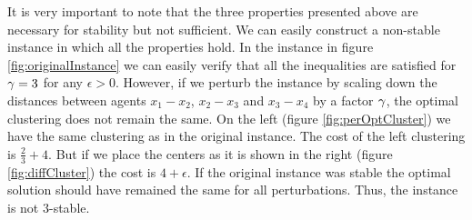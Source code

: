 It is very important to note that the three properties presented above are necessary for stability but not sufficient. We can easily construct a non-stable instance in which all the properties hold. In the instance in figure \ref{fig:originalInstance} we can easily verify that all the inequalities are satisfied for $\gamma=3$ for any $\epsilon >0$. However, if we perturb the instance by scaling down the distances between agents $x_1-x_2$, $x_2-x_3$ and $x_3-x_4$ by a factor $\gamma$, the optimal clustering does not remain the same. On the left (figure \ref{fig:perOptCluster}) we have the same clustering as in the original instance. The cost of the left clustering is $\frac{2}{3}+4$. But if we place the centers as it is shown in the right (figure \ref{fig:diffCluster})  the cost is $4+\epsilon$. If the original instance was stable the optimal solution should have remained the same for all perturbations. Thus, the instance is not $3$-stable. 

